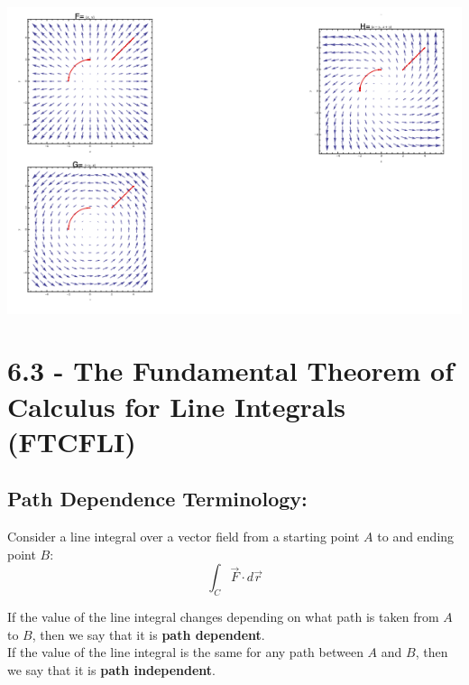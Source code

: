 \includegraphics[angle=90,width=\textwidth]{Ch13s3-Vector-Fields-Work.png}

\pagebreak

\section*{6.3 - The Fundamental Theorem of Calculus for Line Integrals (FTCFLI)}


\hspace*{-.8in}%

\subsection*{Path Dependence Terminology:}

Consider a line integral over a vector field from a starting point \(A\) to and ending point \(B\):
\[
\int_C \vec{F}\cdot d\vec{r}
\]

If the value of the line integral changes depending on what path is taken from \(A\) to \(B\), then we say that it is \textbf{path dependent}.\\
 If the value of the line integral is the same for any path between \(A\) and \(B\), then we say that it is \textbf{path independent}.
~\\

\vspace*{.1in}%

